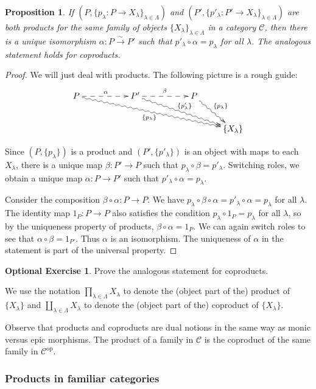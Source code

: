 \documentclass{amsart}[12pt]
\def\sC{\mathscr C}
\newcommand{\op}{\mathrm{op}}
\newcommand{\Def}[1]{#1 \index{#1}}
\numberwithin{equation}{section}
\theoremstyle{plain} %
\newtheorem{prop}[equation]{Proposition}
\theoremstyle{definition}
\newtheorem{exer}[equation]{Optional Exercise}
\theoremstyle{remark}
\newcommand{\sssec}[1]{\subsubsection{#1}}
\begin{document}
\begin{prop} If $(P,\{p_\lambda:P\to X_\lambda\}_{\lambda\in \Lambda})$ and $(P',\{p'_\lambda:P'\to X_\lambda\}_{\lambda\in \Lambda})$ are both products for the same family of objects $\{X_\lambda\}_{\lambda\in \Lambda}$ in a category $\sC$, then there is a unique isomorphism $\alpha: P \xrightarrow{\sim} P'$ such that $p'_\lambda \circ \alpha = p_\lambda$ for all $\lambda$. The analogous statement holds for coproducts.
\end{prop}
\begin{proof} We will just deal with products. The following picture is a rough guide:
\[\xymatrix{ P \ar@{-->}[rr]^{\alpha} \ar@{~>}[drrrrr]_-{\{p_\lambda\}}   & & P' \ar@{-->}[rr]^{\beta} \ar@{~>}[drrr]^-{\{p'_\lambda\}} & & P \ar@{~>}[dr]^-{\{p_\lambda\}}   & \\
& & & & & \{ X_\lambda\} }\]

Since $(P,\{p_\lambda\})$ is a product and $(P',\{p'_\lambda\})$ is an object with maps to each $X_\lambda$, there is a unique map $\beta:P'\to P$ such that $p_\lambda\circ \beta = p'_\lambda$. Switching roles, we obtain a unique map $\alpha:P\to P'$ such that $p'_\lambda\circ \alpha = p_\lambda$. 

Consider the composition $\beta\circ \alpha:P\to P$. We have $p_\lambda \circ \beta \circ \alpha = p'_\lambda \circ \alpha = p_\lambda$ for all $\lambda$. The identity map $1_P:P\to P$ also satisfies the condition $p_\lambda \circ 1_P = p_\lambda$ for all $\lambda$, so by the uniqueness property of products, $\beta\circ \alpha = 1_P$. We can again switch roles to see that $\alpha\circ\beta = 1_{P'}$. Thus $\alpha$ is an isomorphism. The uniqueness of $\alpha$ in the statement is part of the universal property.
\end{proof}
\begin{exer} Prove the analogous statement for coproducts.\end{exer}



We use the notation \Def{$\prod_{\lambda \in \Lambda} X_\lambda$} to denote the (object part of the) product of $\{X_{\lambda}\}$ and \Def{$\coprod_{\lambda \in \Lambda} X_\lambda$} to denote the (object part of the) coproduct of $\{X_{\lambda}\}$.


Observe that products and coproducts are dual notions in the same way as monic versus epic morphisms. The product of a family in $\sC$ is the coproduct of the same family in $\sC^{\op}$.

\sssec{Products in familiar categories}
\end{document}
